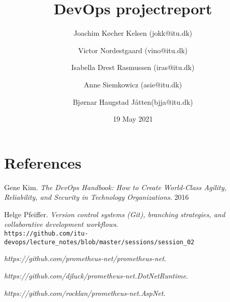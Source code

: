 \documentclass{article}
\title{DevOps projectreport}
\author{Joachim Køcher Kelsen (jokk@itu.dk) \and Victor Nordestgaard (vino@itu.dk) \and Isabella Drest Rasmussen (iras@itu.dk) \and Anne Siemkowicz (asie@itu.dk) \and Bjørnar Haugstad Jåtten(bjja@itu.dk)}
\date{19 May 2021}
\begin{document}
{}

\maketitle

\newpage

\tableofcontents

\newpage



\newpage



\newpage



\newpage



\newpage

\section{References}

\begin{thebibliography}{9}
Gene Kim.
\textit{The DevOps Handbook: How to Create World-Class Agility, Reliability, and Security in Technology Organizations}. 
2016

Helge Pfeiffer. 
\textit{Version control systems (Git), branching strategies, and collaborative development workflows}. 
\\\texttt{https://github.com/itu-devops/lecture_notes/blob/master/sessions/session_02}

\textit{https://github.com/prometheus-net/prometheus-net}.

\textit{https://github.com/djluck/prometheus-net.DotNetRuntime}.

\textit{https://github.com/rocklan/prometheus-net.AspNet}.

\end{thebibliography}
\end{document}
